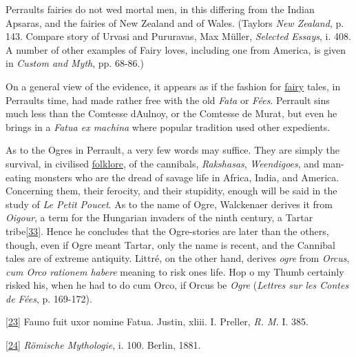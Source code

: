 \documentclass[14pt,a4paper]{memoir}
\newcommand{\ul}[1]{\uline{#1}}
\begin{document}
Perrault\textquotesingle s fairies do not wed mortal men, in this
differing from the Indian Apsaras, and the fairies of New Zealand and of
Wales. (Taylor\textquotesingle s \emph{New Zealand}, p. 143. Compare
story of Urvasi and Pururavas, Max Müller, \emph{Selected Essays}, i.
408. A number of other examples of Fairy loves, including one from
America, is given in \emph{Custom and Myth}, pp. 68-86.)

On a general view of the evidence, it appears as if the fashion for
\ul{fairy} tales, in Perrault\textquotesingle s time, had made rather
free with the old \emph{Fata} or \emph{Fées}. Perrault sins much less
than the Comtesse d\textquotesingle Aulnoy, or the Comtesse de Murat,
but even he brings in a \emph{Fatua ex machina} where popular tradition
used other expedients.

As to the Ogres in Perrault, a very few words may suffice. They are
simply the survival, in civilised \ul{folklore}, of the cannibals,
\emph{Rakshasas}, \emph{Weendigoes}, and man-eating monsters who are the
dread of savage life in Africa, India, and America. Concerning them,
their ferocity, and their stupidity, enough will be said in the study of
\emph{Le Petit Poucet}. As to the name of Ogre, Walckenaer derives it
from \emph{Oigour}, a term for the Hungarian invaders of the ninth
century, a Tartar
tribe\protect\hypertarget{4533318093929944247_33931-h-0.htm.xhtmlux5cux23FNanchor_33}{}{}\protect\hyperlink{4533318093929944247_33931-h-0.htm.xhtmlux5cux23Footnote_33}{{[}33{]}}.
Hence he concludes that the Ogre-stories are later than the others,
though, even if \textquotesingle Ogre\textquotesingle{} meant
\textquotesingle Tartar,\textquotesingle{} only the name is recent, and
the Cannibal tales are of extreme antiquity. Littré, on the other hand,
derives \emph{ogre} from \emph{Orcus}, \emph{cum Orco rationem habere}
meaning to risk one\textquotesingle s life. Hop o\textquotesingle{} my
Thumb certainly risked his, when he had to do \textquotesingle cum
Orco,\textquotesingle{} if Orcus be \emph{Ogre} (\emph{Lettres sur les
Contes de Fées}, p. 169-172).

\protect\hypertarget{4533318093929944247_33931-h-0.htm.xhtmlux5cux23Footnote_23}{}{}
\protect\hyperlink{4533318093929944247_33931-h-0.htm.xhtmlux5cux23FNanchor_23}{{{[}23{]}}}
Fauno fuit uxor nomine Fatua. Justin, xliii. I. Preller, \emph{R. M.} I.
385.

\protect\hypertarget{4533318093929944247_33931-h-0.htm.xhtmlux5cux23Footnote_24}{}{}
\protect\hyperlink{4533318093929944247_33931-h-0.htm.xhtmlux5cux23FNanchor_24}{{{[}24{]}}}
\emph{Römische Mythologie}, i. 100. Berlin, 1881.
\end{document}
